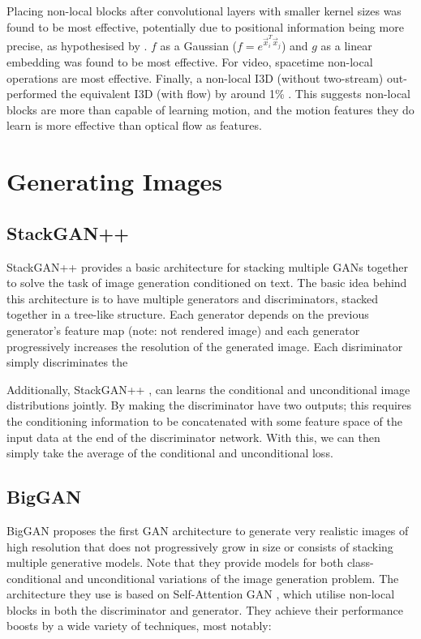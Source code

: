 \documentclass{report}
\theoremstyle{plain}
\theoremstyle{definition}
\theoremstyle{remark}
\numberwithin{equation}{section}
\numberwithin{figure}{section}
\newcommand{\<}{\langle}
\renewcommand{\>}{\rangle}
\begin{document}
Placing non-local blocks after convolutional layers with smaller kernel sizes was found to be most effective, potentially due to positional information being more precise, as hypothesised by \cite{wang_non-local_2017}. $f$ as a Gaussian ($f = e^{\vec{x}_i^T \vec{x}_j}$) and $g$ as a linear embedding was found to be most effective. For video, spacetime non-local operations are most effective. Finally, a non-local I3D (without two-stream) out-performed the equivalent I3D (with flow) by around 1\% \cite{wang_non-local_2017}. This suggests non-local blocks are more than capable of learning motion, and the motion features they do learn is more effective than optical flow as features.
 
\section{Generating Images}

\subsection{StackGAN++}

StackGAN++ \cite{zhang_stackgan++:_2017} provides a basic architecture for stacking multiple GANs together to solve the task of image generation conditioned on text. The basic idea behind this architecture is to have multiple generators and discriminators, stacked together in a tree-like structure. Each generator depends on the previous generator's feature map (note: not rendered image) and each generator progressively increases the resolution of the generated image. Each disriminator simply discriminates the 

Additionally, StackGAN++ \cite{zhang_stackgan++:_2017}, can learns the conditional and unconditional image distributions jointly. By making the discriminator have two outputs; this requires the conditioning information to be concatenated with some feature space of the input data at the end of the discriminator network. With this, we can then simply take the average of the conditional and unconditional loss.

\subsection{BigGAN}
BigGAN \cite{brock_large_2018} proposes the first GAN architecture to generate very realistic images of high resolution that does not progressively grow in size or consists of stacking multiple generative models. Note that they provide models for both class-conditional and unconditional variations of the image generation problem. The architecture they use is based on Self-Attention GAN \cite{zhang_self-attention_2018}, which utilise non-local blocks \cite{wang_non-local_2017} in both the discriminator and generator. They achieve their performance boosts by a wide variety of techniques, most notably:
\end{document}
